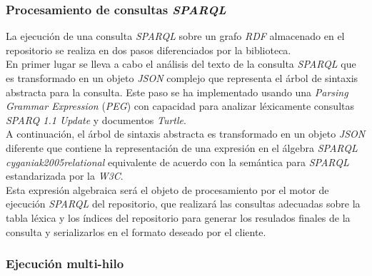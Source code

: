 \subsubsection{Procesamiento de consultas \textit{SPARQL}}

La ejecuci\'on de una consulta \textit{SPARQL} sobre un grafo \textit{RDF} almacenado en el repositorio se realiza en dos pasos diferenciados por la biblioteca.\\
En primer lugar se lleva a cabo el an\'alisis del texto de la consulta \textit{SPARQL} que es transformado en un objeto \textit{JSON} complejo que representa el \'arbol de sintaxis abstracta para la consulta. Este paso se ha implementado usando una \textit{Parsing Grammar Expression} (\textit{PEG}) \cite{pegs} con capacidad para analizar l\'exicamente consultas \textit{SPARQ 1.1 Update} y documentos \textit{Turtle}.\\
A continuaci\'on, el \'arbol de sintaxis abstracta es transformado en un objeto \textit{JSON} diferente que contiene la representaci\'on de una expresi\'on en el \'algebra \textit{SPARQL} \textit{cyganiak2005relational} equivalente de acuerdo con la sem\'antica para \textit{SPARQL} estandarizada por la \textit{W3C}.\\
Esta expresi\'on algebraica ser\'a el objeto de procesamiento por el motor de ejecuci\'on \textit{SPARQL} del repositorio, que realizar\'a las consultas adecuadas sobre la tabla l\'exica y los \'indices del repositorio para generar los resulados finales de la consulta y serializarlos en el formato deseado por el cliente.

\subsubsection{Ejecuci\'on multi-hilo}

